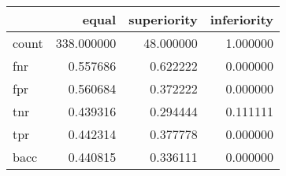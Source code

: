 \begin{tabular}{lrrr}
\toprule
{} &       equal &  superiority &  inferiority \\
\midrule
count &  338.000000 &    48.000000 &     1.000000 \\
fnr   &    0.557686 &     0.622222 &     0.000000 \\
fpr   &    0.560684 &     0.372222 &     0.000000 \\
tnr   &    0.439316 &     0.294444 &     0.111111 \\
tpr   &    0.442314 &     0.377778 &     0.000000 \\
bacc  &    0.440815 &     0.336111 &     0.000000 \\
\bottomrule
\end{tabular}
